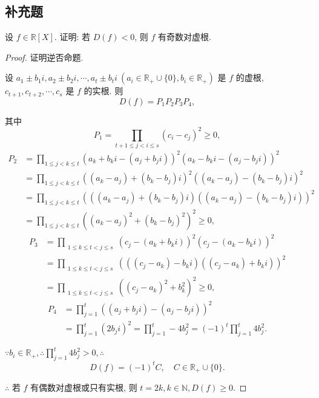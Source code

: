 \documentclass[UTF8]{ctexart}
\begin{document}
\subsection{补充题}
\begin{exercisec}%
    设 $f\in\mathbb{R}[X]$. 证明: 若 $D(f)<0$, 则 $f$ 有奇数对虚根.
\end{exercisec}
\begin{proof}
    证明逆否命题.

    设 $a_1\pm b_1i,a_2\pm b_2i,\cdots,a_t\pm b_ti\ (a_i\in\mathbb{R}_+\cup\{0\},b_i\in\mathbb{R}_+)$ 是 $f$ 的虚根, $c_{t+1},c_{t+2},\cdots,c_s$ 是 $f$ 的实根. 则
    \[D(f)=P_1P_2P_3P_4,\]

    其中
    \[P_1=\prod\limits_{t+1\leq j<i\leq s}(c_i-c_j)^2\geq0,\]
    \begin{align*}
        P_2 & =\prod\limits_{1\leq j<k\leq t}(a_k+b_ki-(a_j+b_ji))^2(a_k-b_ki-(a_j-b_ji))^2 \\
        & =\prod\limits_{1\leq j<k\leq t}((a_k-a_j)+(b_k-b_j)i)^2((a_k-a_j)-(b_k-b_j)i)^2 \\
        & =\prod\limits_{1\leq j<k\leq t}(((a_k-a_j)+(b_k-b_j)i)((a_k-a_j)-(b_k-b_j)i))^2 \\
        & =\prod\limits_{1\leq j<k\leq t}((a_k-a_j)^2+(b_k-b_j)^2)^2\geq0,
    \end{align*}
    \begin{align*}
        P_3 & =\prod\limits_{\substack{1\leq k\leq t<j\leq s}}(c_j-(a_k+b_ki))^2(c_j-(a_k-b_ki))^2 \\
        & =\prod\limits_{\substack{1\leq k\leq t<j\leq s}}(((c_j-a_k)-b_ki)((c_j-a_k)+b_ki))^2 \\
        & =\prod\limits_{\substack{1\leq k\leq t<j\leq s}}((c_j-a_k)^2+b_k^2)^2\geq0,
    \end{align*}
    \begin{align*}
        P_4 & =\prod\limits_{j=1}^t((a_j+b_ji)-(a_j-b_ji))^2 \\
        & =\prod\limits_{j=1}^t(2b_ji)^2=\prod\limits_{j=1}^t-4b_j^2=(-1)^t\prod\limits_{j=1}^t4b_j^2.
    \end{align*}

    $\because b_i\in\mathbb{R}_+,\therefore\prod\limits_{j=1}^t4b_j^2>0,\therefore$
    \[D(f)=(-1)^tC,\quad C\in\mathbb{R}_+\cup\{0\}.\]

    $\therefore$ 若 $f$ 有偶数对虚根或只有实根, 则 $t=2k,k\in\mathbb{N},D(f)\geq0$.
\end{proof}
\end{document}
